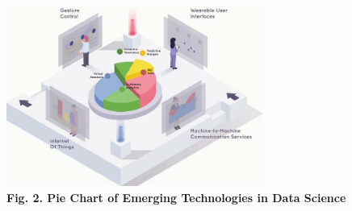 \documentclass[a4paper]{article}
\begin{document}
\begin{figure}[h]
\begin{center}
\includegraphics[width = 0.75\textwidth]{fig2}
\caption*{\textbf{Fig. 2. Pie Chart of Emerging Technologies in Data Science}}
\end{center}
\end{figure}
\end{document}
